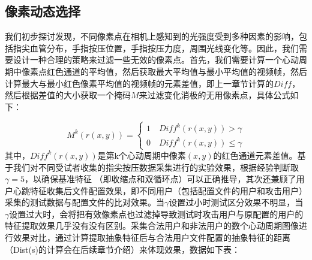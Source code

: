 \subsection{像素动态选择}
{我们初步探讨发现，不同像素点在相机上感知到的光强度受到多种因素的影响，包括指尖血管分布，手指按压位置，手指按压力度，周围光线变化等。因此，我们需要设计一种合理的策略来过滤一些无效的像素点。首先，我们需要计算一个心动周期中像素点红色通道的平均值，然后获取最大平均值与最小平均值的视频帧，然后计算最大与最小红色像素平均值的视频帧的元素差值，即上一章节计算的$Diff$，然后根据差值的大小获取一个掩码$M$来过滤变化消极的无用像素点，具体公式如下：}
\par
\begin{equation}
M^k(r(x,y))=\left\{
	\begin{aligned}
	1 \quad Diff^k(r(x,y))>\gamma\\
	0 \quad Diff^k(r(x,y))\leq \gamma
	\end{aligned}
	\right
	.
\end{equation}
{其中，$Diff^k(r(x,y))$是第k个心动周期中像素$(x,y)$的红色通道元素差值。基于我们对不同受试者收集的指尖按压数据采集进行的实验效果，根据经验判断取$\gamma =5$，以确保基准特征 （即收缩点和双循环点）可以正确推导，其次还兼顾了用户心跳特征收集后文件配置效果，即不同用户（包括配置文件的用户和攻击用户）采集的测试数据与配置文件的比对效果。当$\gamma$设置过小时测试区分效果不明显，当$\gamma$设置过大时，会将把有效像素点也过滤掉导致测试时攻击用户与原配置的用户的特征提取效果几乎没有没有区别。采集合法用户和非法用户的数个心动周期图像进行效果对比，通过计算提取抽象特征后与合法用户文件配置的抽象特征的距离（Dist(s)的计算会在后续章节介绍）来体现效果，数据如下表：}

